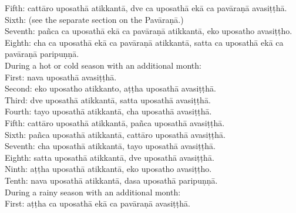 {{{{{					\hspace*{0.5em}Fifth: cattāro uposathā atikkantā, dve ca uposathā ekā ca pavāraṇā avasiṭṭhā.\\
					\hspace*{0.5em}Sixth: (see the separate section on the Pavāraṇā.)\\
					\hspace*{0.5em}Seventh: pañca ca uposathā ekā ca pavāraṇā atikkantā, eko uposatho avasiṭṭho.\\
					\hspace*{0.5em}Eighth: cha ca uposathā ekā ca pavāraṇā atikkantā, satta ca uposathā ekā ca pavāraṇā paripuṇṇā.\smallskip \\
					During a hot or cold season with an additional month:\\
					\hspace*{0.5em}First: nava uposathā avasiṭṭhā.\\
					\hspace*{0.5em}Second: eko uposatho atikkanto, aṭṭha uposathā avasiṭṭhā.\\
					\hspace*{0.5em}Third: dve uposathā atikkantā, satta uposathā avasiṭṭhā.\\
					\hspace*{0.5em}Fourth: tayo uposathā atikkantā, cha uposathā avasiṭṭhā.\\
					\hspace*{0.5em}Fifth: cattāro uposathā atikkantā, pañca uposathā avasiṭṭhā.\\
					\hspace*{0.5em}Sixth: pañca uposathā atikkantā, cattāro uposathā avasiṭṭhā.\\
					\hspace*{0.5em}Seventh: cha uposathā atikkantā, tayo uposathā avasiṭṭhā.\\
					\hspace*{0.5em}Eighth: satta uposathā atikkantā, dve uposathā avasiṭṭhā.\\
					\hspace*{0.5em}Ninth: aṭṭha uposathā atikkantā, eko uposatho avasiṭṭho.\\
					\hspace*{0.5em}Tenth: nava uposathā atikkantā, dasa uposathā paripuṇṇā.\\
					\smallskip
					During a rainy season with an additional month:\\
					\hspace*{0.5em}First: aṭṭha ca uposathā ekā ca pavāraṇā avasiṭṭhā.\\
}}}}}
